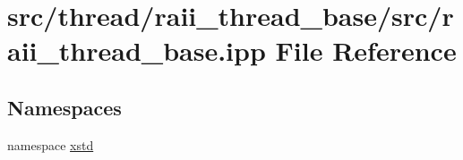 \hypertarget{raii__thread__base_8ipp}{\section{src/thread/raii\-\_\-thread\-\_\-base/src/raii\-\_\-thread\-\_\-base.ipp File Reference}
\label{raii__thread__base_8ipp}
}
\subsection*{Namespaces}
\begin{DoxyCompactItemize}
\item 
namespace \hyperlink{namespacexstd}{xstd}
\end{DoxyCompactItemize}
